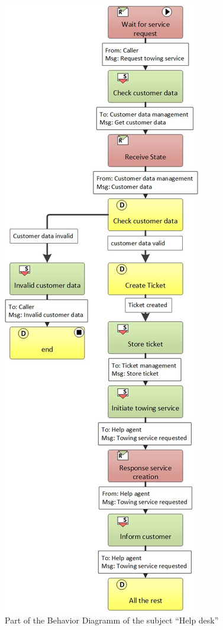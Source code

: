 \begin{figure}
	\centering
	\includegraphics[width=0.7\linewidth]{Figures/Chapter5/figures-hierarchy/Car-Service-Lev9}
	\caption[Part of the Behavior Diagramm of the subject “Help desk”]{Part of the Behavior Diagramm of the subject “Help desk”}
	\label{fig:car-service-lev9}
\end{figure}


